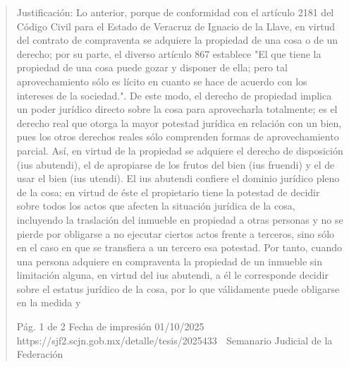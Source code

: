 \documentclass[11pt,a4paper]{article}
\begin{document}
\begin{quote}
Justificación: Lo anterior, porque de conformidad con el artículo 2181 del Código Civil para el Estado
de Veracruz de Ignacio de la Llave, en virtud del contrato de compraventa se adquiere la propiedad
de una cosa o de un derecho; por su parte, el diverso artículo 867 establece "El que tiene la
propiedad de una cosa puede gozar y disponer de ella; pero tal aprovechamiento sólo es lícito en
cuanto se hace de acuerdo con los intereses de la sociedad.". De este modo, el derecho de
propiedad implica un poder jurídico directo sobre la cosa para aprovecharla totalmente; es el
derecho real que otorga la mayor potestad jurídica en relación con un bien, pues los otros derechos
reales sólo comprenden formas de aprovechamiento parcial. Así, en virtud de la propiedad se
adquiere el derecho de disposición (ius abutendi), el de apropiarse de los frutos del bien (ius fruendi)
y el de usar el bien (ius utendi). El ius abutendi confiere el dominio jurídico pleno de la cosa; en
virtud de éste el propietario tiene la potestad de decidir sobre todos los actos que afecten la
situación jurídica de la cosa, incluyendo la traslación del inmueble en propiedad a otras personas y
no se pierde por obligarse a no ejecutar ciertos actos frente a terceros, sino sólo en el caso en que
se transfiera a un tercero esa potestad. Por tanto, cuando una persona adquiere en compraventa la
propiedad de un inmueble sin limitación alguna, en virtud del ius abutendi, a él le corresponde
decidir sobre el estatus jurídico de la cosa, por lo que válidamente puede obligarse en la medida y


                                               Pág. 1 de 2              Fecha de impresión 01/10/2025
  https://sjf2.scjn.gob.mx/detalle/tesis/2025433
                                                  Semanario Judicial de la Federación


\end{quote}
\end{document}
